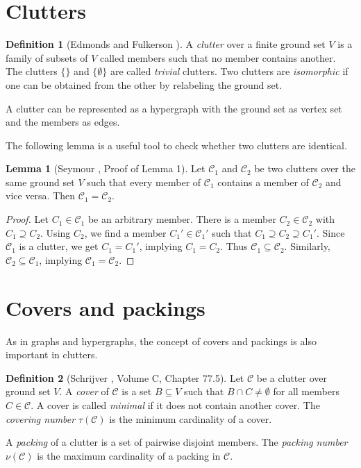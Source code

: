 \documentclass[a4paper, 12pt]{scrbook}
\theoremstyle{definition}
\newtheorem*{definition}{Definition}
\newtheorem{lemma}[theorem]{Lemma}
\begin{document}
   \section{Clutters}
   \begin{definition}[Edmonds and Fulkerson \cite{blocker}]
       A \emph{clutter} over a finite ground set $V$ is a family of subsets of $V$ called members such that no member contains another.
       The clutters $\{\}$ and $\{\emptyset\}$ are called \emph{trivial} clutters.
       Two clutters are \emph{isomorphic} if one can be obtained from the other by relabeling the ground set.
   \end{definition}
   A clutter can be represented as a hypergraph with the ground set as vertex set and the members as edges.

   The following lemma is a useful tool to check whether two clutters are identical.
   \begin{lemma}[Seymour \cite{binary}, Proof of Lemma 1]\label{equalclutters}
       Let $\mathcal{C}_1$ and $\mathcal{C}_2$ be two clutters over the same ground set $V$ such that every member of $\mathcal{C}_1$ contains a member of $\mathcal{C}_2$ and vice versa.
       Then $\mathcal{C}_1=\mathcal{C}_2$.
   \end{lemma}

   \begin{proof}
       Let $C_1 \in \mathcal{C}_1$ be an arbitrary member.
       There is a member $C_2 \in \mathcal{C}_2$ with $C_1 \supseteq C_2$.
       Using $C_2$, we find a member $C_1' \in \mathcal{C}_1'$ such that $C_1 \supseteq C_2 \supseteq C_1'$.
       Since $\mathcal{C}_1$ is a clutter, we get $C_1=C_1'$, implying $C_1=C_2$.
       Thus $\mathcal{C}_1 \subseteq \mathcal{C}_2$.
       Similarly, $\mathcal{C}_2 \subseteq \mathcal{C}_1$, implying $\mathcal{C}_1=\mathcal{C}_2$.
   \end{proof}

\section{Covers and packings}
As in graphs and hypergraphs, the concept of covers and packings is also important in clutters.
\begin{definition}[Schrijver \cite{combopt}, Volume C, Chapter 77.5]
    Let $\mathcal{C}$ be a clutter over ground set $V$.
    A \emph{cover} of $\mathcal{C}$ is a set $B \subseteq V$ such that $B \cap C \neq \emptyset$ for all members $C \in \mathcal{C}$.
    A cover is called \emph{minimal} if it does not contain another cover.
    The \emph{covering number} $\tau(\mathcal{C})$ is the minimum cardinality of a cover.

    A \emph{packing} of a clutter is a set of pairwise disjoint members.
    The \emph{packing number} $\nu(\mathcal{C})$ is the maximum cardinality of a packing in $\mathcal{C}$.
\end{definition}
\end{document}
